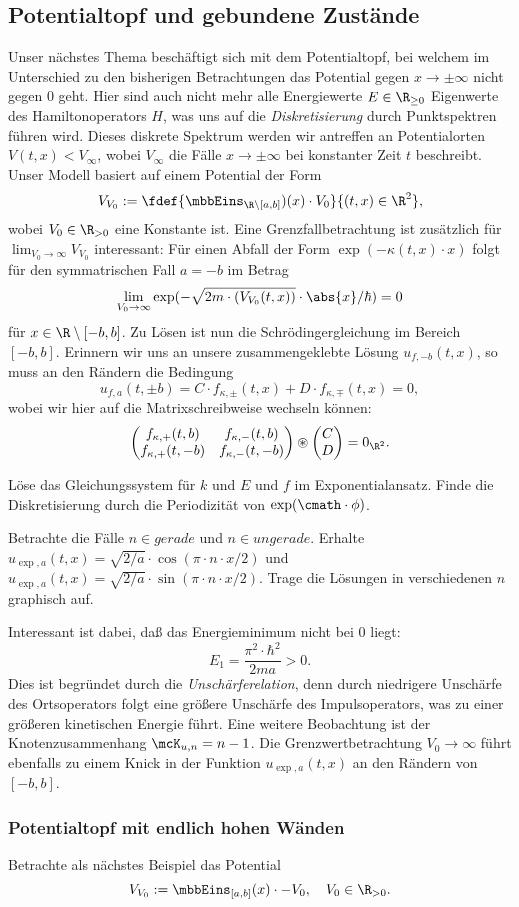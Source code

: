 \documentclass{subfiles}
\begin{document}
    \subsection{Potentialtopf und gebundene Zustände}   
        Unser nächstes Thema beschäftigt sich mit dem Potentialtopf, bei welchem im Unterschied zu den bisherigen Betrachtungen das Potential gegen $x\to\pm\infty$ nicht gegen $0$ geht. Hier sind auch nicht mehr alle Energiewerte $E\in\R_{\geq 0}$ Eigenwerte des Hamiltonoperators $H$, was uns auf die \emph{Diskretisierung} durch Punktspektren führen wird. Dieses diskrete Spektrum werden wir antreffen an Potentialorten $V(t,x)<V_\infty$, wobei $V_\infty$ die Fälle $x\to\pm\infty$ bei konstanter Zeit $t$ beschreibt. Unser Modell basiert auf einem Potential der Form
        \[V_{V_0}:=\fdef{\mbbEins_{\R\setminus[a,b]})(x)\cdot V_0}{(t,x)\in\R^2},\]
        wobei $V_0\in\R_{>0}$ eine Konstante ist. Eine Grenzfallbetrachtung ist zusätzlich für $\lim_{V_0\to\infty} V_{V_0}$ interessant: Für einen Abfall der Form $\exp(-\kappa(t,x)\cdot x)$ folgt für den symmatrischen Fall $a = -b$ im Betrag
        \[\lim_{V_0\to\infty}\exp(-\sqrt{2m\cdot(V_{V_0}(t,x))}\cdot \abs{x}/\hbar) = 0\]
        für $x\in\R\setminus{[-b,b]}$. Zu Lösen ist nun die Schrödingergleichung im Bereich $[-b,b]$. Erinnern wir uns an unsere zusammengeklebte Lösung $u_{f,-b}(t,x)$, so muss an den Rändern die Bedingung
        \[u_{f,a}(t,\pm b) = C\cdot f_{\kappa,\pm}(t,x) + D\cdot f_{\kappa,\mp}(t,x) = 0,\]
        wobei wir hier auf die Matrixschreibweise wechseln können: 
        \[\begin{pmatrix}
            f_{\kappa,+}(t,b) & f_{\kappa,-}(t,b) \\
            f_{\kappa,+}(t,-b) & f_{\kappa,-}(t,-b) 
        \end{pmatrix}\circledast \begin{pmatrix}
            C \\ D
        \end{pmatrix} = 0_{\R^2}.\]
        \begin{Aufgabe}
            \nr{} Löse das Gleichungssystem für $k$ und $E$ und $f$ im Exponentialansatz. Finde die Diskretisierung durch die Periodizität von $\exp(\cmath\cdot\phi)$. 

            \nr{} Betrachte die Fälle $n\in\textit{gerade}$ und $n\in\textit{ungerade}$. Erhalte $u_{\exp,a}(t,x) = \sqrt{2/a}\cdot\cos(\pi\cdot n\cdot x/2)$ und $u_{\exp,a}(t,x) = \sqrt{2/a}\cdot\sin(\pi\cdot n\cdot x/2)$. Trage die Lösungen in verschiedenen $n$ graphisch auf. 
        \end{Aufgabe}
        Interessant ist dabei, daß das Energieminimum nicht bei $0$ liegt:
        \[E_1 = \frac{\pi^2\cdot\hbar^2}{2ma} > 0.\]
        Dies ist begründet durch die \emph{Unschärferelation}, denn durch niedrigere Unschärfe des Ortsoperators folgt eine größere Unschärfe des Impulsoperators, was zu einer größeren kinetischen Energie führt. Eine weitere Beobachtung ist der Knotenzusammenhang $\mcK_{u,n} = n-1$. Die Grenzwertbetrachtung $V_0\to\infty$ führt ebenfalls zu einem Knick in der Funktion $u_{\exp,a}(t,x)$ an den Rändern von $[-b,b]$. 

        \subsubsection*{Potentialtopf mit endlich hohen Wänden}
            Betrachte als nächstes Beispiel das Potential 
            \[V_{V_0}:=\mbbEins_{[a,b]}(x)\cdot - V_0,\quad V_0\in\R_{>0}.\]
\end{document}
